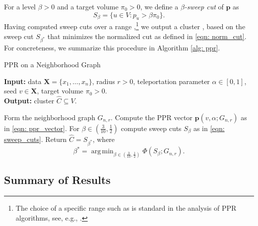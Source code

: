 \documentclass{article}
\newcommand{\1}{\mathbf{1}}
\newcommand{\pbf}{\mathbf{p}}
\newcommand{\Xbf}{\mathbf{X}}
\DeclareMathOperator*{\argmin}{arg\,min}
\newcommand{\pprspace}{{\sc PPR~}}
\theoremstyle{aldenthm}
\theoremstyle{aldenrmrk}
\begin{document}
For a level $\beta > 0$ and a target volume $\pi_0 > 0$, we define a
\emph{$\beta$-sweep cut} of $\pbf$ as  
\begin{equation}
\label{eqn: sweep_cuts}
S_\beta = \{u \in V: p_u > \beta \pi_{0}\}.
\end{equation}
Having computed sweep cuts over a range ,\footnote{The choice of a specific range such as 
 is standard in the analysis of \pprspace
algorithms, see, e.g., \citet{zhu2013}.}
we output a cluster , based on the sweep cut
$S_{\beta^*}$ that minimizes the normalized cut  as defined in \eqref{eqn: norm_cut}. For concreteness, we summarize
this procedure in Algorithm \ref{alg: ppr}.   

\begin{algorithm}
\caption{PPR on a Neighborhood Graph}
\label{alg: ppr}	
{\bfseries Input:} data $\Xbf=\{x_1,\ldots,x_n\}$, radius $r > 0$, teleportation 
parameter $\alpha \in [0,1]$, seed $v \in \Xbf$, target volume $\pi_0 >
0$. \\   
{\bfseries Output:} cluster $\widehat{C} \subseteq V$.
\begin{algorithmic}[1]
  \STATE Form the neighborhood graph $G_{n,r}$.
  \STATE Compute the PPR vector $\pbf(v, \alpha; G_{n,r})$ as in \eqref{eqn:
    ppr_vector}. 
  \STATE For $\beta \in (\frac{3}{10}, \frac{1}{2})$ compute sweep cuts
  $S_{\beta}$ as in \eqref{eqn: sweep_cuts}.
  \STATE Return $\widehat{C} = S_{\beta^*}$, where 
  $$
  \beta^* = \argmin_{\beta \in (\frac{3}{10}, \frac{1}{2})} \Phi(S_{\beta}; G_{n,r}).
  $$
\end{algorithmic}
\end{algorithm}

\subsection{Summary of Results}

\end{document}
